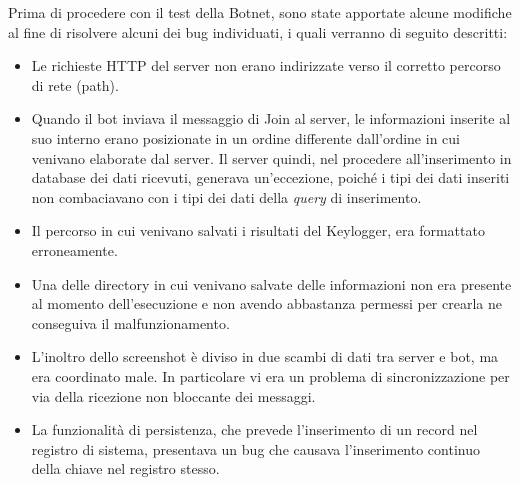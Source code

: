 \medskip
Prima di procedere con il test della Botnet, sono state apportate alcune modifiche al fine di risolvere alcuni dei bug individuati, i quali verranno di seguito descritti:
\begin{itemize}
    \item Le richieste HTTP del server non erano indirizzate verso il corretto percorso di rete (path).
    \item Quando il bot inviava il messaggio di Join al server, le informazioni inserite al suo interno erano posizionate in un ordine differente dall'ordine in cui venivano elaborate dal server. Il server quindi, nel procedere all'inserimento in database dei dati ricevuti, generava un'eccezione, poiché i tipi dei dati inseriti non combaciavano con i tipi dei dati della \textit{query} di inserimento.
    \item Il percorso in cui venivano salvati i risultati del Keylogger, era formattato erroneamente.
    \item Una delle directory in cui venivano salvate delle informazioni non era presente al momento dell'esecuzione e non avendo abbastanza permessi per crearla ne conseguiva il malfunzionamento.
    \item L'inoltro dello screenshot è diviso in due scambi di dati tra server e bot, ma era coordinato male. In particolare vi era un problema di sincronizzazione per via della ricezione non bloccante dei messaggi.
    \item La funzionalità di persistenza, che prevede l'inserimento di un record nel registro di sistema, presentava un bug che causava l'inserimento continuo della chiave nel registro stesso.
\end{itemize}

